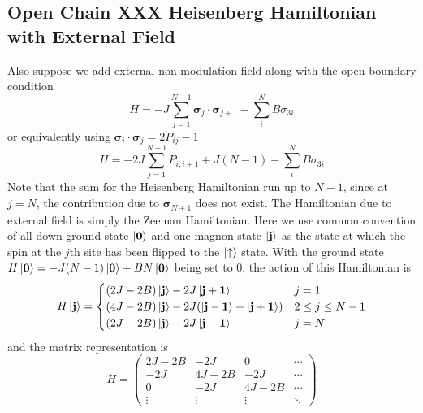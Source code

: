 \documentclass[../../../main.tex]{subfiles}
\begin{document}
\subsection{Open Chain XXX Heisenberg Hamiltonian with External Field}
Also suppose we add external non modulation field along with the open boundary condition
\begin{equation*}
    H = -J\sum_{j=1}^{N-1} \boldsymbol{\sigma}_j\cdot\boldsymbol{\sigma}_{j+1} - \sum_{i } ^N B \sigma_{3i}
\end{equation*}
or equivalently using  $    \boldsymbol{\sigma}_i\cdot\boldsymbol{\sigma}_{j}=2P_{ij}-1$
\begin{equation*}
    H = -2J\sum_{j=1}^{N-1}P_{i,i+1} + J(N-1) - \sum_{i } ^N B \sigma_{3i}
\end{equation*}
Note that the sum for the Heisenberg Hamiltonian run up to $N-1$, since at $j=N$, the contribution due to $\boldsymbol{\sigma}_{N+1}$ does not exist.
The Hamiltonian due to external field is simply the Zeeman Hamiltonian.
Here we use common convention of all down ground state $\ket{\mathbf{0}}$ and one magnon state $\ket{\mathbf{j}}$ as the state at which the spin at the $j$th site has been flipped to the $\ket{\uparrow}$ state.
With the ground state $ H \ket{\mathbf{0}}= -J (N-1) \ket{\mathbf{0}} + B N \ket{\mathbf{0}}$ being set to 0,  the action of this Hamiltonian is
\begin{equation*}
    H \ket{\mathbf{j}} =
    \begin{cases}
        (2J-2B)\ket{\mathbf{j}} -2 J \ket{\mathbf{j+1}}                      & j=1              \\
        (4J-2B) \ket{\mathbf{j}} - 2J(\ket{\mathbf{j-1}}+\ket{\mathbf{j+1}}) & 2\leq j \leq N-1 \\
        (2J-2B)\ket{\mathbf{j}} -2 J \ket{\mathbf{j-1}}                      & j=N              \\
    \end{cases}
\end{equation*}
and the matrix representation is
\begin{equation*}
    H =
    \begin{pmatrix}
        2J-2B  & -2J    & 0      & \cdots \\
        -2J    & 4J-2B  & -2J    & \cdots \\
        0      & -2J    & 4J-2B  & \cdots \\
        \vdots & \vdots & \vdots & \ddots
    \end{pmatrix}
\end{equation*}
\end{document}
